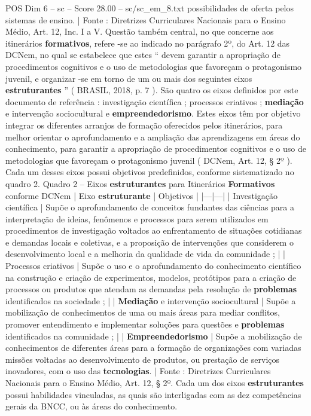 \begin{textsample}{POS Dim 6 – sc – Score 28.00 – sc/sc\_em\_8.txt}
possibilidades de oferta pelos sistemas de ensino. | Fonte : Diretrizes Curriculares Nacionais para o Ensino Médio, Art. 12, Inc.
I a V.
Questão também central, no que concerne aos itinerários \textbf{formativos}, refere -se ao indicado no parágrafo 2º, do Art. 12 das DCNem, no qual se estabelece que estes “ devem garantir a apropriação de procedimentos cognitivos e o uso de metodologias que favoreçam o protagonismo juvenil, e organizar -se em torno de um ou mais dos seguintes eixos \textbf{estruturantes} ” ( BRASIL, 2018, p. 7 ).
São quatro os eixos definidos por este documento de referência : investigação científica ; processos criativos ; \textbf{mediação} e intervenção sociocultural e \textbf{empreendedorismo}.
Estes eixos têm por objetivo integrar os diferentes arranjos de formação oferecidos pelos itinerários, para melhor orientar o aprofundamento e a ampliação das aprendizagens em áreas do conhecimento, para garantir a apropriação de procedimentos cognitivos e o uso de metodologias que favoreçam o protagonismo juvenil ( DCNem, Art. 12, § 2º ).
Cada um desses eixos possui objetivos predefinidos, conforme sistematizado no quadro 2.
Quadro 2 – Eixos \textbf{estruturantes} para Itinerários \textbf{Formativos} conforme DCNem | Eixo \textbf{estruturante} | Objetivos | |---|---| | Investigação científica | Supõe o aprofundamento de conceitos fundantes das ciências para a interpretação de ideias, fenômenos e processos para serem utilizados em procedimentos de investigação voltados ao enfrentamento de situações cotidianas e demandas locais e coletivas, e a proposição de intervenções que considerem o desenvolvimento local e a melhoria da qualidade de vida da comunidade ; | | Processos criativos | Supõe o uso e o aprofundamento do conhecimento científico na construção e criação de experimentos, modelos, protótipos para a criação de processos ou produtos que atendam as demandas pela resolução de \textbf{problemas} identificados na sociedade ; | | \textbf{Mediação} e intervenção sociocultural | Supõe a mobilização de conhecimentos de uma ou mais áreas para mediar conflitos, promover entendimento e implementar soluções para questões e \textbf{problemas} identificados na comunidade ; | | \textbf{Empreendedorismo} | Supõe a mobilização de conhecimentos de diferentes áreas para a formação de organizações com variadas missões voltadas ao desenvolvimento de produtos, ou prestação de serviços inovadores, com o uso das \textbf{tecnologias}. | Fonte : Diretrizes Curriculares Nacionais para o Ensino Médio, Art. 12, § 2º.
Cada um dos eixos \textbf{estruturantes} possui habilidades vinculadas, as quais são interligadas com as dez competências gerais da BNCC, ou às áreas do conhecimento.

\end{textsample}
